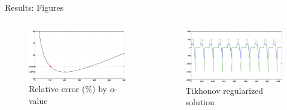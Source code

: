 \documentclass[final]{beamer}
\begin{document}
\begin{frame}[t]
\begin{columns}[t]
\begin{column}{.465\textwidth}
\begin{block}{Results: Figures}
\begin{columns}
\end{columns}

\vspace{1cm}

\begin{columns}

\begin{column}{.5\textwidth}
\begin{center}
\begin{figure}
\includegraphics[width=.98\linewidth]{alpha_errs_iter.eps}
\caption{Relative error (\%) by $\alpha$-value}
\label{fig:alpha-iter}
\end{figure}
\end{center}
\end{column}

\begin{column}{.5\textwidth}
\begin{center}
\begin{figure}
\includegraphics[width=.98\linewidth]{alpha_errs_morozov.eps}
\caption{Tikhonov regularized solution}
\label{fig:iter-tik}
\end{figure}
\end{center}
\end{column}


\end{columns}
\end{block}
\end{column}
\end{columns}
\end{frame}
\end{document}

